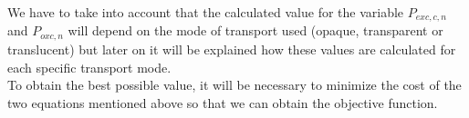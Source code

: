 \vspace{10pt}
We have to take into account that the calculated value for the variable $P_{exc,c,n}$ and $P_{oxc,n}$ will depend on the mode of transport used (opaque, transparent or translucent) but later on it will be explained how these values are calculated for each specific transport mode.\\
To obtain the best possible value, it will be necessary to minimize the cost of the two equations mentioned above so that we can obtain the objective function.


